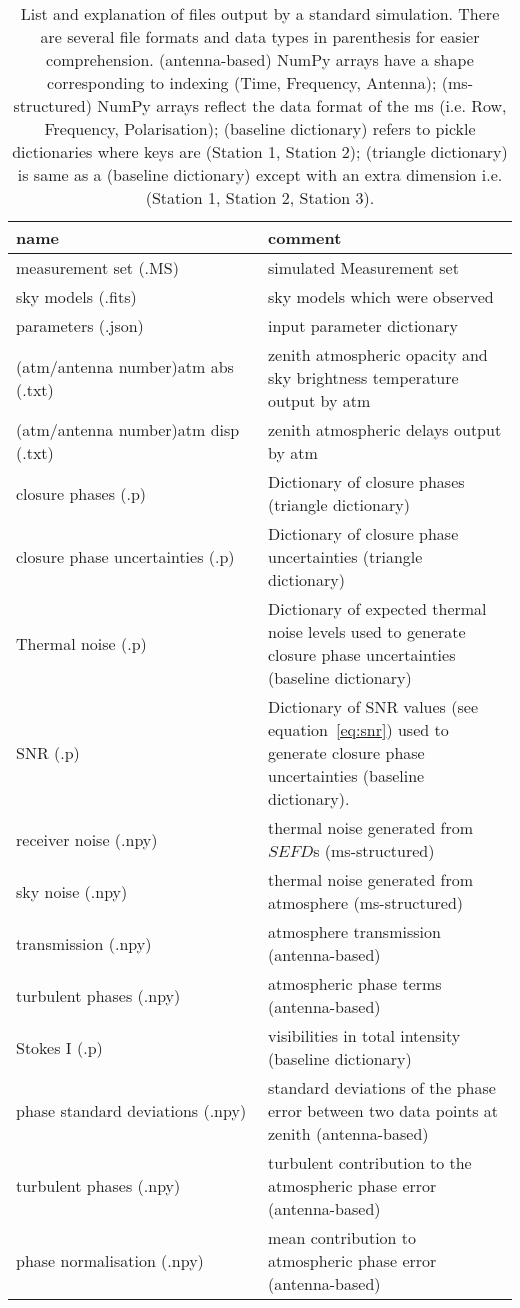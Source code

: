 \begin{longtable}{p{0.5\linewidth}|p{0.6\linewidth}}
\caption[List and explanation of files output by a standard simulation]{List and explanation of files output by a standard simulation. There are several file formats and data types in parenthesis for easier comprehension. (antenna-based) {\sc NumPy} arrays have a shape corresponding to indexing (Time, Frequency, Antenna); ({\sc ms}-structured) {\sc NumPy} arrays reflect the data format of the {\sc ms} (i.e. Row, Frequency, Polarisation); (baseline dictionary) refers to {\sc pickle} dictionaries where keys are (Station 1, Station 2); (triangle dictionary) is same as a (baseline dictionary) except with an extra dimension i.e. (Station 1, Station 2, Station 3).}
\label{tab:outputs}\\
\hline
name&comment\\
\hline
measurement set (.MS) & simulated Measurement set \\
sky models (.fits)& sky models which were observed\\
parameters (.json) &input parameter dictionary\\
(atm/antenna number)atm abs (.txt)& zenith atmospheric opacity and sky brightness temperature output by {\sc atm}\\
(atm/antenna number)atm disp (.txt)& zenith atmospheric delays output by {\sc atm}\\
closure phases (.p) & Dictionary of closure phases  (triangle dictionary)\\
closure phase uncertainties (.p) & Dictionary of closure phase uncertainties (triangle dictionary)\\
Thermal noise  (.p)  & Dictionary of expected thermal noise levels used to generate closure phase uncertainties (baseline dictionary)\\
SNR (.p)  & Dictionary of SNR values (see equation~\ref{eq:snr}) used to generate closure phase uncertainties (baseline dictionary). \\
receiver noise (.npy) & thermal noise generated from $SEFD$s ({\sc ms}-structured)\\
sky noise (.npy) & thermal noise generated from atmosphere ({\sc ms}-structured)\\
transmission (.npy) & atmosphere transmission (antenna-based)\\
turbulent phases (.npy) & atmospheric phase terms (antenna-based)\\
Stokes I (.p)& visibilities in total intensity (baseline dictionary)\\
phase standard deviations (.npy)& standard deviations of the phase error between two data points at zenith (antenna-based)\\
turbulent phases (.npy) & turbulent contribution to the atmospheric phase error (antenna-based)\\
phase normalisation (.npy) & mean contribution to atmospheric phase error (antenna-based)\\


\end{longtable}

